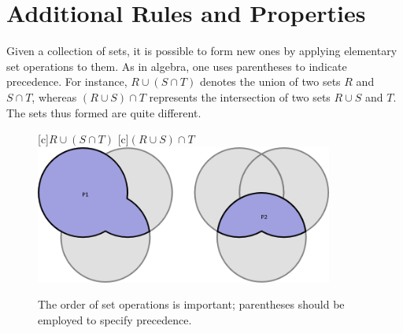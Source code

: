 \section{Additional Rules and Properties}

Given a collection of sets, it is possible to form new ones by applying elementary set operations to them.
As in algebra, one uses parentheses to indicate precedence.
For instance, $R \cup (S \cap T)$ denotes the union of two sets $R$ and $S \cap T$, whereas $(R \cup S) \cap T$ represents the intersection of two sets $R \cup S$ and $T$.
The sets thus formed are quite different.

\begin{figure}[htb]
\begin{center}
\begin{psfrags}
[c]{$R \cup (S \cap T)$}
[c]{$(R \cup S) \cap T$}
\includegraphics[height=4.55cm]{Figures/1Chapter/triple}
\end{psfrags}
\caption{The order of set operations is important; parentheses should be employed to specify precedence.}
\end{center}
\end{figure}

